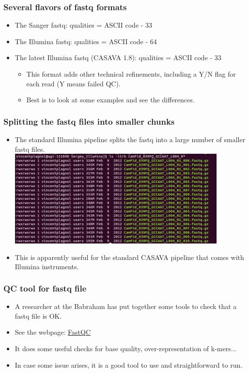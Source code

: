 \documentclass{beamer}
\begin{document}
\begin{frame}
  \frametitle{Several flavors of fastq formats}
  \begin{itemize}
  \item The Sanger fastq: qualities = ASCII code - 33
  \item The Illumina fastq: qualities = ASCII code - 64
  \item The latest Illumina fastq (CASAVA 1.8): qualities = ASCII code - 33    
    \begin{itemize}
    \item This format adds other technical refinements, including a Y/N flag for each read (Y means failed QC).
    \item Best is to look at some examples and see the differences.
    \end{itemize}
  \end{itemize}
\end{frame}


\begin{frame}
  \frametitle{Splitting the fastq files into smaller chunks}
   \begin{itemize}
   \item The standard Illumina pipeline splits the fastq into a large number of smaller fastq files.\\
     \includegraphics[width=11cm]{fig/fastq_split.png}
   \item This is apparently useful for the standard CASAVA pipeline that comes with Illumina instruments.
   \end{itemize}
\end{frame}

\begin{frame}
  \frametitle{QC tool for fastq file}
  \begin{itemize}
  \item A researcher at the Babraham has put together some tools to check that a fastq file is OK.
  \item See the webpage: \href{http://www.bioinformatics.bbsrc.ac.uk/projects/download.html\#fastqc}{FastQC}
  \item It does some useful checks for base quality, over-representation of k-mers...
  \item In case some issue arises, it is a good tool to use and straightforward to run.
  \end{itemize}
\end{frame}
\end{document}
